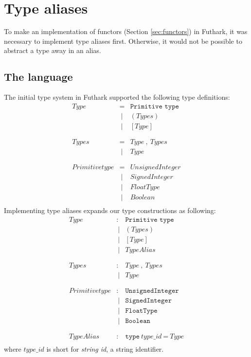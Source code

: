\section{Type aliases}
To make an implementation of functors (Section \ref{sec:functors}) in Futhark, it was necessary
to implement type aliases first. Otherwise, it would not be possible to abstract
a type away in an alias.
\subsection{The language}\label{futharks_types}
The initial type system in Futhark supported the following type definitions:
\begin{align*}
  Type           & = & \texttt{Primitive type} \\
                 &\ | & ( Types ) \\
                 &\ | & [ Type ] \\
  \\
  \\
  Types          & = & Type\ ,\ Types \\
                 &\ | & Type \\
  \\
  \\
  Primitive type & = & UnsignedInteger \\
                 &\ | & SignedInteger \\
                 &\ | & FloatType \\
                 &\ | & Boolean \\
\end{align*}
Implementing type aliases expands our type constructions as following:
\begin{align*}
  Type           & : & \texttt{Primitive type} \\
                 &\ | & ( Types ) \\
                 &\ | & [ Type ] \\
                 &\ | & TypeAlias \\
  \\
  \\
  Types          & : & Type\ ,\ Types \\
                 &\ | & Type \\
  \\
  \\
  Primitive type & : & \texttt{UnsignedInteger} \\
                 &\ | & \texttt{SignedInteger} \\
                 &\ | & \texttt{FloatType} \\
                 &\ | & \texttt{Boolean} \\
  \\
  \\
  TypeAlias      & :  & \texttt{type}\ type\_id\ \texttt{=}\ Type \\
\end{align*}
where $type\_id$ is short for \textit{string id}, a string identifier.

